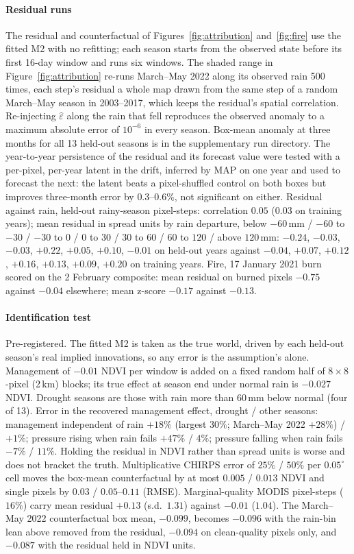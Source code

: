 \documentclass[letterpaper]{article} %
\begin{document}
\paragraph{Residual runs} The residual and counterfactual of Figures~\ref{fig:attribution} and~\ref{fig:fire} use the fitted M2 with no refitting; each season starts from the observed state before its first 16-day window and runs six windows. The shaded range in Figure~\ref{fig:attribution} re-runs March--May 2022 along its observed rain 500 times, each step's residual a whole map drawn from the same step of a random March--May season in 2003--2017, which keeps the residual's spatial correlation. Re-injecting $\hat\varepsilon$ along the rain that fell reproduces the observed anomaly to a maximum absolute error of $10^{-6}$ in every season. Box-mean anomaly at three months for all 13 held-out seasons is in the supplementary run directory. The year-to-year persistence of the residual and its forecast value were tested with a per-pixel, per-year latent in the drift, inferred by MAP on one year and used to forecast the next: the latent beats a pixel-shuffled control on both boxes but improves three-month error by $0.3$--$0.6\%$, not significant on either. Residual against rain, held-out rainy-season pixel-steps: correlation $0.05$ ($0.03$ on training years); mean residual in spread units by rain departure, below $-60$\,mm / $-60$ to $-30$ / $-30$ to $0$ / $0$ to $30$ / $30$ to $60$ / $60$ to $120$ / above $120$\,mm: $-0.24$, $-0.03$, $-0.03$, $+0.22$, $+0.05$, $+0.10$, $-0.01$ on held-out years against $-0.04$, $+0.07$, $+0.12$, $+0.16$, $+0.13$, $+0.09$, $+0.20$ on training years. Fire, 17 January 2021 burn scored on the 2 February composite: mean residual on burned pixels $-0.75$ against $-0.04$ elsewhere; mean z-score $-0.17$ against $-0.13$.

\paragraph{Identification test} Pre-registered. The fitted M2 is taken as the true world, driven by each held-out season's real implied innovations, so any error is the assumption's alone. Management of $-0.01$ NDVI per window is added on a fixed random half of $8\times8$-pixel (2\,km) blocks; its true effect at season end under normal rain is $-0.027$ NDVI. Drought seasons are those with rain more than $60$\,mm below normal (four of 13). Error in the recovered management effect, drought / other seasons: management independent of rain $+18\%$ (largest $30\%$; March--May 2022 $+28\%$) / $+1\%$; pressure rising when rain fails $+47\%$ / $4\%$; pressure falling when rain fails $-7\%$ / $11\%$. Holding the residual in NDVI rather than spread units is worse and does not bracket the truth. Multiplicative CHIRPS error of $25\%$ / $50\%$ per $0.05^\circ$ cell moves the box-mean counterfactual by at most $0.005$ / $0.013$ NDVI and single pixels by $0.03$ / $0.05$--$0.11$ (RMSE). Marginal-quality MODIS pixel-steps ($16\%$) carry mean residual $+0.13$ (s.d.\ $1.31$) against $-0.01$ ($1.04$). The March--May 2022 counterfactual box mean, $-0.099$, becomes $-0.096$ with the rain-bin lean above removed from the residual, $-0.094$ on clean-quality pixels only, and $-0.087$ with the residual held in NDVI units.
\end{document}
